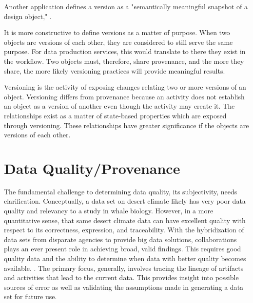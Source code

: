 Another application defines a version as a "semantically meaningful snapshot of a design object," \cite{Tagger2005}.  

It is more constructive to define versions as a matter of purpose.  When two objects are versions of each other, they are considered to still serve the same purpose.  For data production services, this would translate to there they exist in the workflow. Two objects must, therefore, share provenance, and the more they share, the more likely versioning practices will provide meaningful results.

Versioning is the activity of exposing changes relating two or more versions of an object.  Versioning differs from provenance because an activity does not establish an object as a version of another even though the activity may create it.  The relationships exist as a matter of state-based properties which are exposed through versioning.  These relationships have greater significance if the objects are versions of each other.

\section{Data Quality/Provenance}

The fundamental challenge to determining data quality, its subjectivity, needs clarification.
Conceptually, a data set on desert climate likely has very poor data quality and relevancy to a study in whale biology.
However, in a more quantitative sense, that same desert climate data can have excellent quality with respect to its correctness, expression, and traceability.
With the hybridization of data sets from disparate agencies to provide big data solutions, collaborations plays an ever present role in achieving broad, valid findings.
This requires good quality data and the ability to determine when data with better quality becomes available. \cite{Wiil:2000:RDH:338407.338517}.
The primary focus, generally, involves tracing the lineage of artifacts and activities that lead to the current data.
This provides insight into possible sources of error as well as validating the assumptions made in generating a data set for future use.

